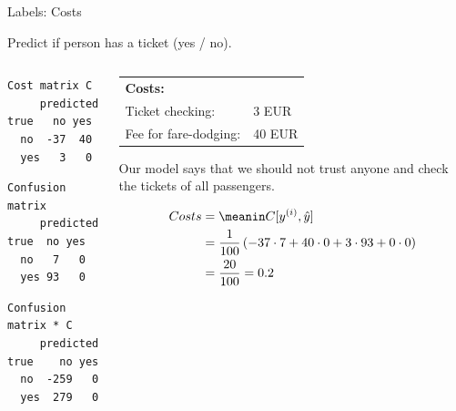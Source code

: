 \documentclass[11pt,compress,t,notes=noshow, xcolor=table]{beamer}
\makeatletter
\newenvironment{kframe}{%
 \def\at@end@of@kframe{}%
 \ifinner\ifhmode%
  \def\at@end@of@kframe{\end{minipage}}%
  \begin{minipage}{\columnwidth}%
 \fi\fi%
 \def\FrameCommand##1{\hskip\@totalleftmargin \hskip-\fboxsep
 \colorbox{shadecolor}{##1}\hskip-\fboxsep
     \hskip-\linewidth \hskip-\@totalleftmargin \hskip\columnwidth}%
 \MakeFramed {\advance\hsize-\width
   \@totalleftmargin\z@ \linewidth\hsize
   \@setminipage}}%
 {\par\unskip\endMakeFramed%
 \at@end@of@kframe}
\newenvironment{knitrout}{}{} %
\makeatother
\begin{document}
\begin{vbframe}{Labels: Costs}

Predict if person has a ticket (yes / no).\\ 

\begin{columns}
\begin{column}{0.3\textwidth} 

\begin{knitrout}\scriptsize
{}\color{fgcolor}\begin{kframe}
\begin{verbatim}
Cost matrix C
     predicted
true   no yes
  no  -37  40
  yes   3   0
\end{verbatim}
\end{kframe} \begin{kframe}\begin{verbatim}
Confusion matrix
     predicted
true  no yes
  no   7   0
  yes 93   0
\end{verbatim}
\end{kframe} \begin{kframe}\begin{verbatim}
Confusion matrix * C
     predicted
true    no yes
  no  -259   0
  yes  279   0
\end{verbatim}
\end{kframe}
\end{knitrout}

\end{column}
\begin{column}{0.65\textwidth}


  \begin{tabular}{ll}
    \textbf{Costs:} & \\
    Ticket checking:& 3 EUR\\
    Fee for fare-dodging:& 40 EUR\\
  \end{tabular}
  \lz
  
  Our model says that we should not trust anyone and check the tickets of 
  all passengers.
  
  
  \begin{align*}
      Costs &= \meanin C[\yi, \yih] \\
      &= \frac{1}{100} \left( 
      -37 \cdot 7 + 
      40 \cdot 0 + 
      3 \cdot 93 +
      0 \cdot 0 
      \right) \\
      &= \frac{20}{100} = 0.2
    \end{align*}
\end{column}

\end{columns}


\end{vbframe}
\end{document}
